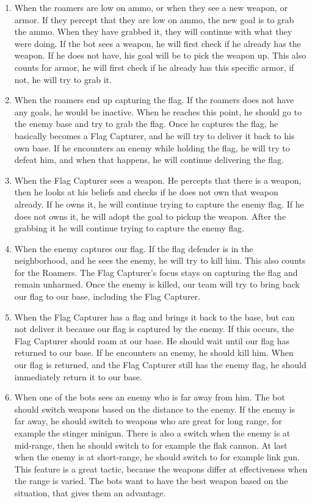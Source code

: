 \begin{enumerate}
	\item When the roamers are low on ammo, or when they see a new weapon, or armor. If they percept that they are low on ammo, the new goal is to grab the ammo. When they have grabbed it, they will continue with what they were doing. If the bot sees a weapon, he will first check if he already has the weapon. If he does not have, his goal will be to pick the weapon up. This also counts for armor, he will first check if he already has this specific armor, if not, he will try to grab it. \\
	\item When the roamers end up capturing the flag. If the roamers does not have any goals, he would be inactive. When he reaches this point, he should go to the enemy base and try to grab the flag. Once he captures the flag, he basically becomes a Flag Capturer, and he will try to deliver it back to his own base. If he encounters an enemy while holding the flag, he will try to defeat him, and when that happens, he will continue delivering the flag.\\ 
	\item When the Flag Capturer sees a weapon. He percepts that there is a weapon, then he looks at his beliefs and checks if he does not own that weapon already. If he owns it, he will continue trying to capture the enemy flag. If he does not owns it, he will adopt the goal to pickup the weapon. After the grabbing it he will continue trying to capture the enemy flag.\\
	\item When the enemy captures our flag. If the flag defender is in the neighborhood, and he sees the enemy, he will try to kill him. This also counts for the Roamers. The Flag Capturer's focus stays on capturing the flag and remain unharmed. Once the enemy is killed, our team will try to bring back our flag to our base, including the Flag Capturer. \\
	\item When the Flag Capturer has a flag and brings it back to the base, but can not deliver it because our flag is captured by the enemy. If this occurs, the Flag Capturer should roam at our base. He should wait until our flag has returned to our base. If he encounters an enemy, he should kill him. When our flag is returned, and the Flag Capturer still has the enemy flag, he should immediately return it to our base.\\
	\item When one of the bots sees an enemy who is far away from him. The bot should switch weapons based on the distance to the enemy. If the enemy is far away, he should switch to weapons who are great for long range, for example the stinger minigun. There is also a switch when the enemy is at mid-range, then he should switch to for example the flak cannon. At last when the enemy is at short-range, he should switch to for example link gun. This feature is a great tactic, because the weapons differ at effectiveness when the range is varied. The bots want to have the best weapon based on the situation, that gives them an advantage. 
\end{enumerate}